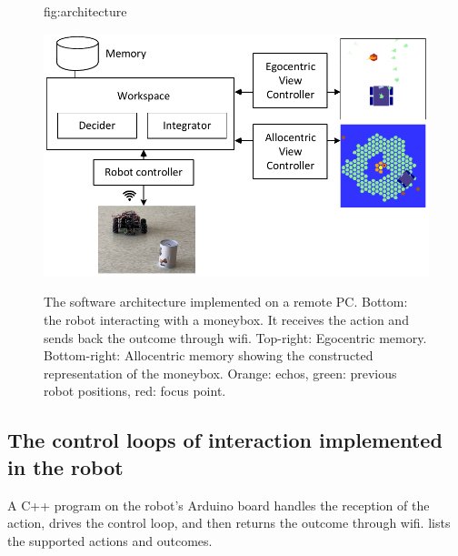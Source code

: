 \documentclass[pmlr]{jmlr}%
\begin{document}
\begin{figure}[htbp]
	\floatconts
	{fig:architecture}
	{\caption{The software architecture implemented on a remote PC. 
			Bottom: the robot interacting with a moneybox. 
			It receives the action and sends back the outcome through wifi.
			Top-right: Egocentric memory.
			Bottom-right: Allocentric memory showing the constructed representation of the moneybox.
			Orange: echos, green: previous robot positions, red: focus point.}}
	{\includegraphics[width=0.8\linewidth]{images/Figure_2_Architecture}}
\end{figure}


\subsection{The control loops of interaction implemented in the robot}
\label{moves}

A C++ program on the robot's Arduino board handles the reception of the action, drives the control loop, and then returns the outcome through wifi. 
 lists the supported actions and outcomes.
\end{document}

